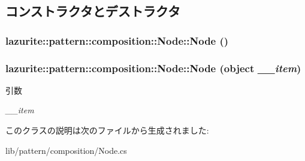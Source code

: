 \subsection{コンストラクタとデストラクタ}
\hypertarget{classlazurite_1_1pattern_1_1composition_1_1_node_a9587eb952372f4516d5a57fa289ede48}{
\subsubsection[{Node}]{\setlength{\rightskip}{0pt plus 5cm}lazurite::pattern::composition::Node::Node ()}}
\label{classlazurite_1_1pattern_1_1composition_1_1_node_a9587eb952372f4516d5a57fa289ede48}
\hypertarget{classlazurite_1_1pattern_1_1composition_1_1_node_a85f9410474100c67c410408586764285}{
\subsubsection[{Node}]{\setlength{\rightskip}{0pt plus 5cm}lazurite::pattern::composition::Node::Node (object {\em \_\-\_\-item})}}
\label{classlazurite_1_1pattern_1_1composition_1_1_node_a85f9410474100c67c410408586764285}

\begin{DoxyParams}{引数}
\item[{\em \_\-\_\-item}]\end{DoxyParams}


このクラスの説明は次のファイルから生成されました:\begin{DoxyCompactItemize}
\item 
lib/pattern/composition/Node.cs\end{DoxyCompactItemize}
